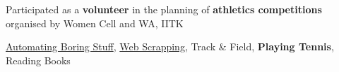 \vspace{3mm}
\begin{cvitems}
  \item Participated as a \textbf{volunteer} in the planning of \textbf{athletics competitions} organised by Women Cell and WA, IITK
  \item \href{https://github.com/sunil-dhaka/automate-stuff-with-python}{\faGithub{} {Automating Boring Stuff}}, \href{https://github.com/sunil-dhaka/python-webScrappers}{\faGithub{} {Web Scrapping}}, Track \& Field, \textbf{Playing Tennis}, Reading Books
\end{cvitems}